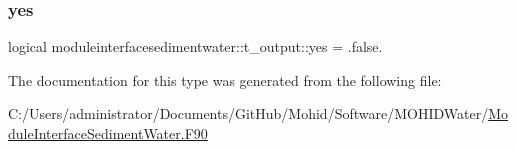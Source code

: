 \mbox{\label{structmoduleinterfacesedimentwater_1_1t__output_a0347e410d9b52c6285a6ff350b489e37}} 
\subsubsection{\texorpdfstring{yes}{yes}}
{\footnotesize\ttfamily logical moduleinterfacesedimentwater\+::t\+\_\+output\+::yes = .false.\hspace{0.3cm}{\ttfamily [private]}}



The documentation for this type was generated from the following file\+:\begin{DoxyCompactItemize}
\item 
C\+:/\+Users/administrator/\+Documents/\+Git\+Hub/\+Mohid/\+Software/\+M\+O\+H\+I\+D\+Water/\mbox{\hyperlink{_module_interface_sediment_water_8_f90}{Module\+Interface\+Sediment\+Water.\+F90}}\end{DoxyCompactItemize}
